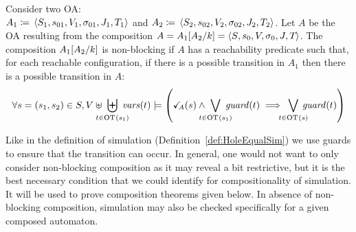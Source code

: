 \documentclass[runningheads]{llncs}
\begin{document}
%
\begin{definition} \label{Def:Non-block}
Consider two OA:\\ \(A_1 \defobject \OAg[1]\) and \( A_2 \defobject \OAg[2]\).
Let $A$ be the OA resulting from the composition \(A = A_1{\left[A_2\middle/k\right]}= \left<S_{},s_{0},V_{},\sigma_{0},J_{},T_{}\right>\). 
The composition \(A_1{\left[A_2\middle/k\right]}\) is non-blocking if   \(A \) has a reachability predicate such that, for each reachable configuration, if there is a possible transition in \(A_1\) then there is a possible transition in \(A\):
\[ \forall s = \mpar{s_1, s_2} \in S, V \uplus \biguplus_\subbox{t \in \fOT{s_1}} \fvars{t} \models  \left(\reach{A}\mpar{s} \wedge \bigvee_\subbox{t \in \fOT{s_1}} \fguard{t} \implies \bigvee_\subbox{t \in \fOT{s}} \fguard{t} \right)
\]
\end{definition}
Like in the definition of simulation (Definition~\ref{def:HoleEqualSim}) we use guards to ensure that the transition can occur. 
In general, one would not want to only consider non-blocking composition as it may reveal a bit restrictive, but it is the best necessary condition that we could  identify for compositionality of simulation. It will be used to prove composition theorems given below. 
In absence of non-blocking composition, simulation may also be checked specifically for a given composed automaton.
\end{document}
